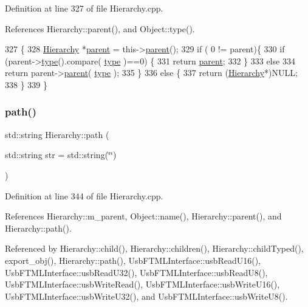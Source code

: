 Definition at line 327 of file Hierarchy.\+cpp.



References Hierarchy\+::parent(), and Object\+::type().


\begin{DoxyCode}
327                                             \{
328   \hyperlink{classHierarchy}{Hierarchy} *\hyperlink{classHierarchy_a1c7bec8257e717f9c1465e06ebf845fc}{parent} = this->\hyperlink{classHierarchy_a1c7bec8257e717f9c1465e06ebf845fc}{parent}();
329   \textcolor{keywordflow}{if} ( 0 != parent)\{
330     \textcolor{keywordflow}{if} (parent->\hyperlink{classObject_a84f99f70f144a83e1582d1d0f84e4e62}{type}().compare( \hyperlink{classObject_a84f99f70f144a83e1582d1d0f84e4e62}{type} )==0) \{
331       \textcolor{keywordflow}{return} \hyperlink{classHierarchy_a1c7bec8257e717f9c1465e06ebf845fc}{parent};
332     \}
333     \textcolor{keywordflow}{else}
334       \textcolor{keywordflow}{return} parent->\hyperlink{classHierarchy_a1c7bec8257e717f9c1465e06ebf845fc}{parent}( \hyperlink{classObject_a84f99f70f144a83e1582d1d0f84e4e62}{type} );
335   \}
336   \textcolor{keywordflow}{else} \{
337     \textcolor{keywordflow}{return} (\hyperlink{classHierarchy}{Hierarchy}*)NULL;
338   \}
339 \}
\end{DoxyCode}
\mbox{\label{classHierarchy_aa7990fa7caf132d83e361ce033c6c65a}} 
\subsubsection{\texorpdfstring{path()}{path()}}
{\footnotesize\ttfamily std\+::string Hierarchy\+::path (\begin{DoxyParamCaption}\item[{std\+::string}]{str = {\ttfamily std\+:\+:string(\char`\"{}\char`\"{})} }\end{DoxyParamCaption})\hspace{0.3cm}{\ttfamily [inherited]}}



Definition at line 344 of file Hierarchy.\+cpp.



References Hierarchy\+::m\+\_\+parent, Object\+::name(), Hierarchy\+::parent(), and Hierarchy\+::path().



Referenced by Hierarchy\+::child(), Hierarchy\+::children(), Hierarchy\+::child\+Typed(), export\+\_\+obj(), Hierarchy\+::path(), Usb\+F\+T\+M\+L\+Interface\+::usb\+Read\+U16(), Usb\+F\+T\+M\+L\+Interface\+::usb\+Read\+U32(), Usb\+F\+T\+M\+L\+Interface\+::usb\+Read\+U8(), Usb\+F\+T\+M\+L\+Interface\+::usb\+Write\+Read(), Usb\+F\+T\+M\+L\+Interface\+::usb\+Write\+U16(), Usb\+F\+T\+M\+L\+Interface\+::usb\+Write\+U32(), and Usb\+F\+T\+M\+L\+Interface\+::usb\+Write\+U8().


